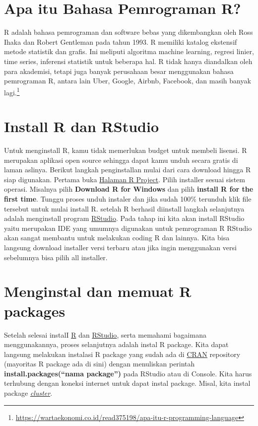 \documentclass[
]{elegantbook}
\begin{document}
\hypertarget{apa-itu-bahasa-pemrograman-r}{%
\section{Apa itu Bahasa Pemrograman R?}\label{apa-itu-bahasa-pemrograman-r}}

R adalah bahasa pemrograman dan software bebas yang dikembangkan oleh Ross Ihaka dan Robert Gentleman pada tahun 1993. R memiliki katalog ekstensif metode statistik dan grafis. Ini meliputi algoritma machine learning, regresi linier, time series, inferensi statistik untuk beberapa hal. R tidak hanya diandalkan oleh para akademisi, tetapi juga banyak perusahaan besar menggunakan bahasa pemrograman R, antara lain Uber, Google, Airbnb, Facebook, dan masih banyak lagi.\footnote{\url{https://wartaekonomi.co.id/read375198/apa-itu-r-programming-language}}

\hypertarget{install-r-dan-rstudio}{%
\section{Install R dan RStudio}\label{install-r-dan-rstudio}}

Untuk menginstall R, kamu tidak memerlukan budget untuk membeli lisensi. R merupakan aplikasi open source sehingga dapat kamu unduh secara gratis di laman aslinya. Berikut langkah penginstallan mulai dari cara download hingga R siap digunakan. Pertama buka \href{https://cran.r-project.org/}{Halaman R Project}. Pilih installer sesuai sistem operasi. Misalnya pilih \textbf{Download R for Windows} dan pilih \textbf{install R for the first time}. Tunggu proses unduh instaler dan jika sudah 100\% terunduh klik file tersebut untuk mulai install R. setelah R berhasil diinstall langkah selanjutnya adalah menginstall program \href{https://posit.co/download/rstudio-desktop/}{RStudio}. Pada tahap ini kita akan install RStudio yaitu merupakan IDE yang umumnya digunakan untuk pemrograman R RStudio akan sangat membantu untuk melakukan coding R dan lainnya. Kita bisa langsung download installer versi terbaru atau jika ingin menggunakan versi sebelumnya bisa pilih all installer.

\hypertarget{menginstal-dan-memuat-r-packages}{%
\section{Menginstal dan memuat R packages}\label{menginstal-dan-memuat-r-packages}}

Setelah selesai instalI \href{https://cran.r-project.org/}{R} dan \href{https://posit.co/download/rstudio-desktop/}{RStudio}, serta memahami bagaimana menggunakannya, proses selanjutnya adalah instal R package. Kita dapat langsung melakukan instalasi R package yang sudah ada di \href{https://cran.r-project.org/}{CRAN} repository (mayoritas R package ada di sini) dengan menuliskan perintah \textbf{install.packages(``nama package'')} pada RStudio atau di Console. Kita harus terhubung dengan koneksi internet untuk dapat instal package. Misal, kita instal package \href{https://cran.r-project.org/web/packages/cluster/index.html}{\emph{cluster}}.
\end{document}
